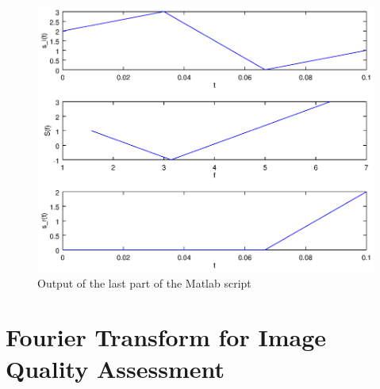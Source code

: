 \documentclass[DIN, pagenumber=false, fontsize=11pt, parskip=half]{scrartcl}
\begin{document}
    \subsection{}
                  
    \begin{figure}[H]
        \centering
        \includegraphics[trim = {0 8cm 27cm 0}, clip,width=\textwidth]{transforms.eps}
        \caption{Output of the last part of the Matlab script}
    \end{figure}

    \section{Fourier Transform for Image Quality Assessment}
    \subsection{}
\end{document}
